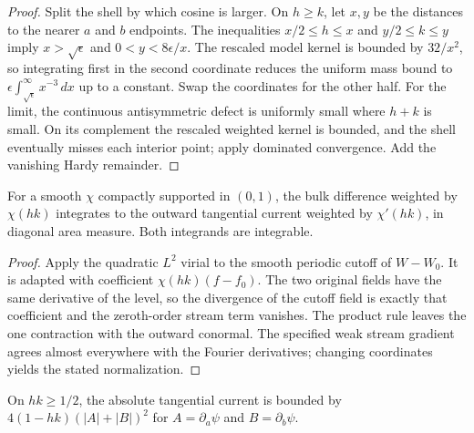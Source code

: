 \begin{proof}
\leanok
Split the shell by which cosine is larger. On $h\ge k$, let $x,y$ be the
distances to the nearer $a$ and $b$ endpoints. The inequalities
$x/2\le h\le x$ and $y/2\le k\le y$ imply
$x>\sqrt{\epsilon}$ and $0<y<8\epsilon/x$. The rescaled model kernel is
bounded by $32/x^2$, so integrating first in the second coordinate
reduces the uniform mass bound to $\epsilon\int_{\sqrt{\epsilon}}^\infty x^{-3}\,dx$
up to a constant. Swap the coordinates for the other half.
For the limit, the continuous antisymmetric defect is uniformly small
where $h+k$ is small. On its complement the rescaled weighted kernel
is bounded, and the shell eventually misses each interior point;
apply dominated convergence. Add the vanishing Hardy remainder.
\end{proof}

\begin{lemma}
\label{lem:mixed-tangential-cutoff}
\leanok
For a smooth $\chi$ compactly supported in $(0,1)$, the bulk difference
weighted by $\chi(hk)$ integrates to the outward tangential current weighted
by $\chi'(hk)$, in diagonal area measure. Both integrands are integrable.
\end{lemma}

\begin{proof}
\leanok
Apply the quadratic $L^2$ virial to the smooth periodic cutoff of $W-W_0$.
It is adapted with coefficient $\chi(hk)(f-f_0)$. The two original fields
have the same derivative of the level, so the divergence of the cutoff field
is exactly that coefficient and the zeroth-order stream term vanishes.
The product rule leaves the one contraction with the outward conormal.
The specified weak stream gradient agrees almost everywhere with the
Fourier derivatives; changing coordinates yields the stated normalization.
\end{proof}

\begin{lemma}
\label{lem:mixed-tangential-center}
\leanok
On $hk\ge1/2$, the absolute tangential current is bounded by
$4(1-hk)(|A|+|B|)^2$ for $A=\partial_a\psi$ and $B=\partial_b\psi$.
\end{lemma}

